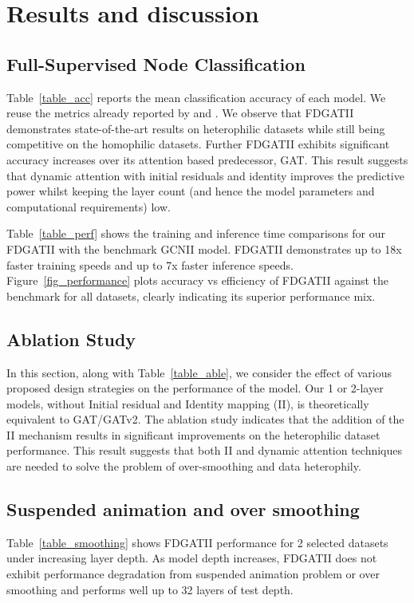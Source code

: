 \documentclass{article}
\begin{document}
\section{Results and discussion}
\subsection{Full-Supervised Node Classification}
Table~\ref{table_acc} reports the mean classification accuracy of each model. We reuse the metrics already reported by \citet{chen2020simple} and \cite{zhu2020beyond}. We observe that FDGATII demonstrates state-of-the-art results on heterophilic datasets while still being competitive on the homophilic datasets. Further FDGATII exhibits significant accuracy increases over its attention based predecessor, GAT. This result suggests that dynamic attention with initial residuals and identity improves the predictive power whilst keeping the layer count (and hence the model parameters and computational requirements) low. 

Table~\ref{table_perf} shows the training and inference time comparisons for our FDGATII with the benchmark GCNII model. FDGATII demonstrates up to 18x faster training speeds and up to 7x faster inference speeds. Figure~\ref{fig_performance} plots accuracy vs efficiency of FDGATII against the benchmark for all datasets, clearly indicating its superior performance mix.

\subsection{Ablation Study}
In this section, along with Table~\ref{table_able}, we consider the effect of various proposed design strategies on the performance of the model. Our 1 or 2-layer models, without Initial residual and Identity mapping (II), is theoretically equivalent to GAT/GATv2. The ablation study indicates that the addition of the II mechanism results in significant improvements on the heterophilic dataset performance. This result suggests that both II and dynamic attention techniques are needed to solve the problem of over-smoothing and data heterophily.   

\subsection{Suspended animation and over smoothing}
Table~\ref{table_smoothing} shows FDGATII performance for 2 selected datasets under increasing layer depth. As model depth increases, FDGATII does not exhibit performance degradation from suspended animation problem or over smoothing and performs well up to 32 layers of test depth.   
\end{document}
